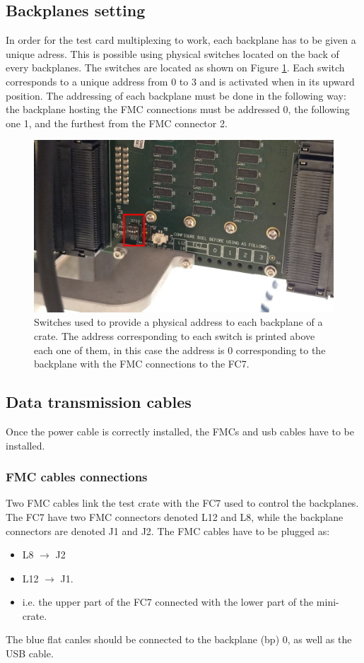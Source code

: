 \documentclass[10pt,a4paper]{article}
\begin{document}
\subsection{Backplanes setting}
In order for the test card multiplexing to work, each backplane has to be given a unique adress. This is possible using physical switches located on the back of every backplanes. The switches are located as shown on Figure \ref{BackPlaneSwitch}. Each switch corresponds to a unique address from 0 to 3 and is activated when in its upward position. The addressing of each backplane must be done in the following way: the backplane hosting the FMC connections must be addressed 0, the following one 1, and the furthest from the FMC connector 2.

\begin{figure}[h!]
 \includegraphics[width=\linewidth]{BackPlaneSwitch.jpeg} 
  \caption{Switches used to provide a physical address to each backplane of a crate. The address corresponding to each switch is printed above each one of them, in this case the address is 0 corresponding to the backplane with the FMC connections to the FC7.}
  \label{BackPlaneSwitch}
\end{figure}

\subsection{Data transmission cables}
Once the power cable is correctly installed, the FMCs and usb cables have to be installed.
\subsubsection{FMC cables connections}
Two FMC cables link the test crate with the FC7 used to control the backplanes. The FC7 have two FMC connectors denoted L12 and L8, while the backplane connectors are denoted J1 and J2. The FMC cables have to be plugged as:
\begin{itemize}
\item L8 $\rightarrow$ J2
\item L12 $\rightarrow$ J1.
\item i.e. the upper part of the FC7 connected with the lower part of the mini-crate.
\end{itemize}
The blue flat canles should be connected to the backplane (bp) 0, as well as the USB cable. 
\end{document}
